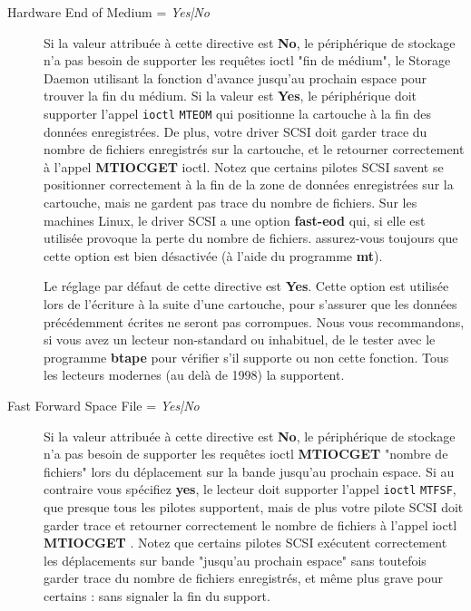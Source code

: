 \begin{description}
\item [Hardware End of Medium = {\it Yes|No}]
   Si la valeur attribu\'ee \`a cette directive est {\bf No}, le p\'eriph\'erique de 
   stockage n'a pas besoin de supporter les requ\^etes ioctl "fin de m\'edium",  
   le Storage Daemon utilisant la fonction d'avance jusqu'au prochain espace 
   pour trouver la fin du m\'edium. Si la valeur est {\bf Yes}, le p\'eriph\'erique 
   doit supporter l'appel {\tt ioctl}  {\tt MTEOM}  qui positionne la cartouche 
   \`a la fin des donn\'ees enregistr\'ees. De plus, votre driver SCSI doit garder trace 
   du nombre de fichiers enregistr\'es sur la cartouche, et le retourner correctement 
   \`a l'appel {\bf MTIOCGET} ioctl. Notez que certains pilotes SCSI savent se 
   positionner correctement \`a la fin de la zone de donn\'ees enregistr\'ees sur la cartouche, 
   mais ne gardent pas trace du nombre de fichiers. Sur les machines Linux, le 
   driver SCSI a une option {\bf fast-eod} qui, si elle est utilis\'ee 
   provoque la perte du nombre de fichiers. assurez-vous toujours que cette 
   option est bien d\'esactiv\'ee (\`a l'aide du programme {\bf mt}). 
   
   Le r\'eglage par d\'efaut de cette directive est {\bf Yes}. Cette option est utilis\'ee 
   lors de l'\'ecriture \`a la suite d'une cartouche, pour s'assurer que les donn\'ees 
   pr\'ec\'edemment \'ecrites ne seront pas corrompues. Nous vous recommandons, si vous 
   avez un lecteur non-standard ou inhabituel, de le tester avec le programme 
   {\bf btape} pour v\'erifier s'il supporte ou non cette fonction. Tous les lecteurs 
   modernes (au del\`a de 1998) la supportent.
   
\item [Fast Forward Space File = {\it Yes|No}]
   Si la valeur attribu\'ee \`a cette directive est {\bf No}, le p\'eriph\'erique de
   stockage n'a pas besoin de supporter les requ\^etes ioctl {\bf MTIOCGET} 
   "nombre de fichiers" lors du d\'eplacement sur la bande jusqu'au prochain espace. Si au contraire 
   vous sp\'ecifiez {\bf yes}, le lecteur doit supporter l'appel {\tt ioctl} {\tt MTFSF}, 
   que presque tous les pilotes supportent, mais de plus votre pilote SCSI doit 
   garder trace et retourner correctement le nombre de fichiers \`a l'appel 
   ioctl  {\bf MTIOCGET} . Notez que certains pilotes SCSI ex\'ecutent correctement 
   les d\'eplacements sur bande "jusqu'au prochain espace" sans toutefois garder trace 
   du nombre de fichiers enregistr\'es, et m\^eme plus grave pour certains : sans 
   signaler la fin du support.


\end{description}
